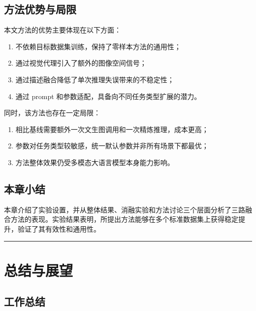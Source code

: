 \documentclass[12pt,a4paper,UTF8,oneside,openany]{ctexrep}
\providecommand{\tightlist}{%
  \setlength{\itemsep}{0pt}\setlength{\parskip}{0pt}}
\begin{document}
\hypertarget{ux65b9ux6cd5ux4f18ux52bfux4e0eux5c40ux9650}{%
\subsection{方法优势与局限}\label{ux65b9ux6cd5ux4f18ux52bfux4e0eux5c40ux9650}}

本文方法的优势主要体现在以下方面：

\begin{enumerate}
\def\labelenumi{\arabic{enumi}.}
\tightlist
\item
  不依赖目标数据集训练，保持了零样本方法的通用性；
\item
  通过视觉代理引入了额外的图像空间信号；
\item
  通过描述融合降低了单次推理失误带来的不稳定性；
\item
  通过 prompt 和参数适配，具备向不同任务类型扩展的潜力。
\end{enumerate}

同时，该方法也存在一定局限：

\begin{enumerate}
\def\labelenumi{\arabic{enumi}.}
\tightlist
\item
  相比基线需要额外一次文生图调用和一次精炼推理，成本更高；
\item
  参数对任务类型较敏感，统一默认参数并非所有场景下都最优；
\item
  方法整体效果仍受多模态大语言模型本身能力影响。
\end{enumerate}

\hypertarget{ux672cux7ae0ux5c0fux7ed3-2}{%
\subsection{本章小结}\label{ux672cux7ae0ux5c0fux7ed3-2}}

本章介绍了实验设置，并从整体结果、消融实验和方法讨论三个层面分析了三路融合方法的表现。实验结果表明，所提出方法能够在多个标准数据集上获得稳定提升，验证了其有效性和通用性。

\begin{center}\rule{0.5\linewidth}{0.5pt}\end{center}

\hypertarget{ux603bux7ed3ux4e0eux5c55ux671b}{%
\section{总结与展望}\label{ux603bux7ed3ux4e0eux5c55ux671b}}

\hypertarget{ux5de5ux4f5cux603bux7ed3}{%
\subsection{工作总结}\label{ux5de5ux4f5cux603bux7ed3}}
\end{document}
